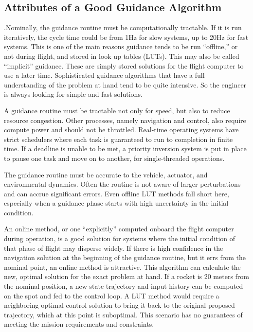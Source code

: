 \subsection{Attributes of a Good Guidance Algorithm}
.Nominally, the guidance routine must be computationally tractable. If it is run iteratively, the cycle time could be from 1Hz for slow systems, up to 20Hz for fast systems. This is one of the main reasons guidance tends to be run ``offline,'' or not during flight, and stored in look up tables (LUTs). This may also be called ``implicit'' guidance. These are simply stored solutions for the flight computer to use a later time. Sophisticated guidance algorithms that have a full understanding of the problem at hand tend to be quite intensive. So the engineer is always looking for simple and fast solutions.

A guidance routine must be tractable not only for speed, but also to reduce resource congestion. Other processes, namely navigation and control, also require compute power and should not be throttled. Real-time operating systems have strict schedulers where each task is guaranteed to run to completion in finite time. If a deadline is unable to be met, a priority inversion system is put in place to pause one task and move on to another, for single-threaded operations.

The guidance routine must be accurate to the vehicle, actuator, and environmental dynamics. Often the routine is not aware of larger perturbations and can accrue significant errors. Even offline LUT methods fall short here, especially when a guidance phase starts with high uncertainty in the initial condition.

An online method, or one ``explicitly'' computed onboard the flight computer during operation, is a good solution for systems where the initial condition of that phase of flight may disperse widely. If there is high confidence in the navigation solution at the beginning of the guidance routine, but it errs from the nominal point, an online method is attractive. This algorithm can calculate the new, optimal solution for the exact problem at hand. If a rocket is 20 meters from the nominal position, a new state trajectory and input history can be computed on the spot and fed to the control loop. A LUT method would require a neighboring optimal control solution to bring it back to the original proposed trajectory, which at this point is suboptimal. This scenario has no guarantees of meeting the mission requirements and constraints.

